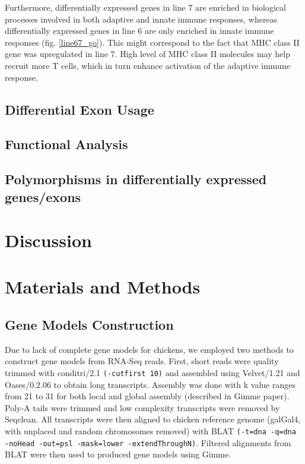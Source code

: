 \documentclass[10pt]{article}
\begin{document}
Furthermore, differentially expressed genes in line 7 are enriched in biological processes involved in
both adaptive and innate immune responses, whereas
differentially expressed genes in line 6 are only enriched in innate immune responses (fig. \ref{line67_go}).
This might correspond to the fact that MHC class II gene was upregulated in line 7.
High level of MHC class II molecules may help recruit more T cells, which in turn enhance activation of
the adaptive immune response.


\subsection*{Differential Exon Usage}

\subsection*{Functional Analysis}
\subsection*{Polymorphisms in differentially expressed genes/exons}


\section*{Discussion}

\section*{Materials and Methods}
\subsection{Gene Models Construction}
Due to lack of complete gene models for chickens, we employed two methods to
construct gene models from RNA-Seq reads.
First, short reads were quality trimmed with conditri/2.1\cite{} \texttt{(-cutfirst 10)}
and assembled using Velvet/1.21\cite{} and Oases/0.2.06\cite{} to obtain long transcripts.
Assembly was done with k value ranges from 21 to 31 for both local and global assembly
(described in Gimme paper\cite{}).
Poly-A tails were trimmed and low complexity transcripts were removed by Seqclean\cite{}.
All transcripts were then aligned to chicken reference genome (galGal4, with unplaced and random 
chromosomes removed) with BLAT\cite{} \texttt{(-t=dna -q=dna -noHead -out=psl -mask=lower -extendThroughN)}.
Filtered alignments from BLAT were then used to produced gene models using Gimme\cite{}.
\end{document}
